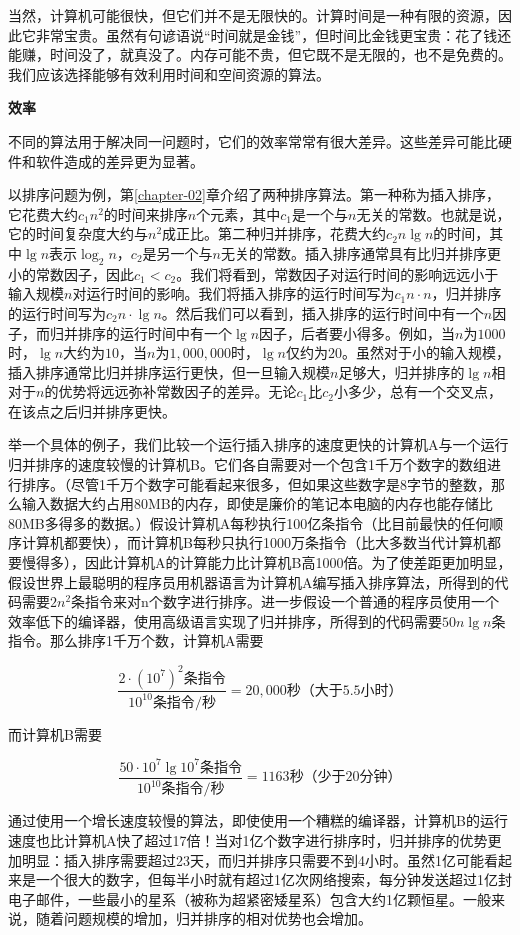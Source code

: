 \documentclass[lang=cn,newtx,10pt,scheme=chinese]{elegantbook}
\begin{document}
当然，计算机可能很快，但它们并不是无限快的。计算时间是一种有限的资源，因此它非常宝贵。虽然有句谚语说``时间就是金钱''，但时间比金钱更宝贵：花了钱还能赚，时间没了，就真没了。内存可能不贵，但它既不是无限的，也不是免费的。我们应该选择能够有效利用时间和空间资源的算法。

\textbf{效率}

不同的算法用于解决同一问题时，它们的效率常常有很大差异。这些差异可能比硬件和软件造成的差异更为显著。

以排序问题为例，第\ref{chapter-02}章介绍了两种排序算法。第一种称为插入排序，它花费大约$c_1n^2$的时间来排序$n$个元素，其中$c_1$是一个与$n$无关的常数。也就是说，它的时间复杂度大约与$n^2$成正比。第二种归并排序，花费大约$c_2n\lg n$的时间，其中$\lg n$表示$\log_2n$，$c_2$是另一个与$n$无关的常数。插入排序通常具有比归并排序更小的常数因子，因此$c_1 < c_2$。我们将看到，常数因子对运行时间的影响远远小于输入规模$n$对运行时间的影响。我们将插入排序的运行时间写为$c_1n \cdot n$，归并排序的运行时间写为$c_2n \cdot \lg n$。然后我们可以看到，插入排序的运行时间中有一个$n$因子，而归并排序的运行时间中有一个$\lg n$因子，后者要小得多。例如，当$n$为$1000$时，$\lg n$大约为$10$，当$n$为$1,000,000$时，$\lg n$仅约为$20$。虽然对于小的输入规模，插入排序通常比归并排序运行更快，但一旦输入规模$n$足够大，归并排序的$\lg n$相对于$n$的优势将远远弥补常数因子的差异。无论$c_1$比$c_2$小多少，总有一个交叉点，在该点之后归并排序更快。

举一个具体的例子，我们比较一个运行插入排序的速度更快的计算机A与一个运行归并排序的速度较慢的计算机B。它们各自需要对一个包含1千万个数字的数组进行排序。（尽管1千万个数字可能看起来很多，但如果这些数字是8字节的整数，那么输入数据大约占用80MB的内存，即使是廉价的笔记本电脑的内存也能存储比80MB多得多的数据。）假设计算机A每秒执行100亿条指令（比目前最快的任何顺序计算机都要快），而计算机B每秒只执行1000万条指令（比大多数当代计算机都要慢得多），因此计算机A的计算能力比计算机B高1000倍。为了使差距更加明显，假设世界上最聪明的程序员用机器语言为计算机A编写插入排序算法，所得到的代码需要$2n^2$条指令来对n个数字进行排序。进一步假设一个普通的程序员使用一个效率低下的编译器，使用高级语言实现了归并排序，所得到的代码需要$50n\lg n$条指令。那么排序1千万个数，计算机A需要

$$
\frac{2\cdot (10^7)^2\text{条指令}}{10^{10}\text{条指令}/\text{秒}}
=
20,000\text{秒（大于5.5小时）}
$$

而计算机B需要

$$
\frac{50\cdot 10^7\lg 10^7\text{条指令}}{10^{10}\text{条指令}/\text{秒}}
=
1163\text{秒（少于20分钟）}
$$

通过使用一个增长速度较慢的算法，即使使用一个糟糕的编译器，计算机B的运行速度也比计算机A快了超过17倍！当对1亿个数字进行排序时，归并排序的优势更加明显：插入排序需要超过23天，而归并排序只需要不到4小时。虽然1亿可能看起来是一个很大的数字，但每半小时就有超过1亿次网络搜索，每分钟发送超过1亿封电子邮件，一些最小的星系（被称为超紧密矮星系）包含大约1亿颗恒星。一般来说，随着问题规模的增加，归并排序的相对优势也会增加。
\end{document}
